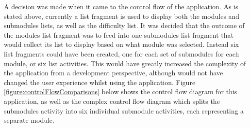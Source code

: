\documentclass{article}
\begin{document}
A decision was made when it came to the control flow of the application. As is stated above, currently a list fragment is used to display both the modules and submodules lists, as well as the difficulty list. It was decided that the outcome of the modules list fragment was to feed into one submodules list fragment that would collect its list to display based on what module was selected. Instead six list fragments could have been created, one for each set of submodules for each module, or six list activities. This would have greatly increased the complexity of the application from a development perspective, although would not have changed the user experience whilst using the application. Figure \ref{figure:controlFlowComparisons} below shows the control flow diagram for this application, as well as the complex control flow diagram which splits the submodules activity into six individual submodule activities, each representing a separate module.
\end{document}
